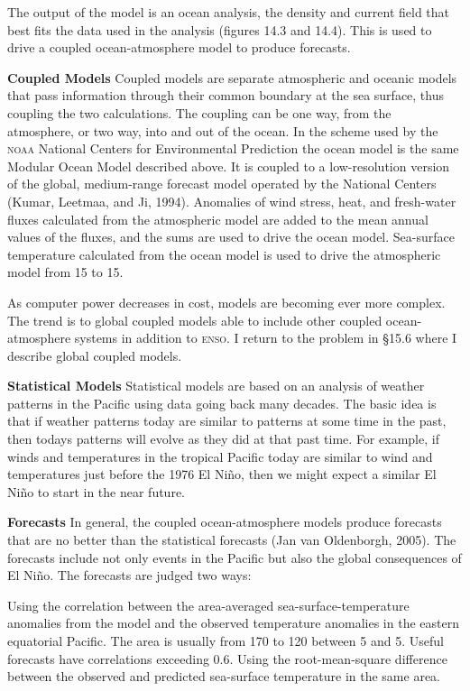 The output of the model is an ocean analysis, the density and current field that best fits the data used in the analysis (figures 14.3 and 14.4). This is used to drive a coupled ocean-atmosphere model to produce forecasts.

\textbf{Coupled Models} Coupled models are separate atmospheric and oceanic models that pass information through their common boundary at the sea surface, thus coupling the two calculations. The coupling can be one way, from the atmosphere, or two way, into and out of the ocean. In the scheme used by the \textsc{noaa} National Centers for Environmental Prediction the ocean model is the same Modular Ocean Model described above. It is coupled to a low-resolution version of the global, medium-range forecast model operated by the National Centers (Kumar, Leetmaa, and Ji, 1994). Anomalies of wind stress, heat, and
fresh-water fluxes calculated from the atmospheric model are added to the mean annual values of the fluxes, and the sums are used to drive the ocean model. Sea-surface temperature calculated from the ocean model is used to drive the atmospheric model from 15 to 15.

As computer power decreases in cost, models are becoming ever more complex. The trend is to global coupled models able to include other coupled ocean-atmosphere systems in addition to \textsc{enso}. I return to the problem in \S 15.6 where I describe global coupled models.

\textbf{Statistical Models} Statistical models are based on an analysis of weather patterns in the Pacific using data going back many decades. The basic idea is that if weather patterns today are similar to patterns at some time in the past, then todays patterns will evolve as they did at that past time. For example, if winds and temperatures in the tropical Pacific today are similar to wind and temperatures just before the 1976 El Ni\~{n}o, then we might expect a similar El Ni\~{n}o to start in the near future. 

\textbf{Forecasts} In general, the coupled ocean-atmosphere models produce  forecasts that are no better than the statistical forecasts (Jan van Oldenborgh, 2005). The forecasts include not only events in the Pacific but also the global consequences of El Ni\~{n}o. The forecasts are judged two ways:
\begin{enumerate}
\vitem
Using the correlation between the area-averaged sea-surface-temperature
anomalies from the model and the observed temperature
anomalies in the eastern equatorial Pacific. The area is usually from 170 to
120 between 5 and 5. Useful forecasts have
correlations exceeding 0.6.
\vitem
Using the root-mean-square difference between the observed and predicted sea-surface temperature in the same area.
\end{enumerate}


